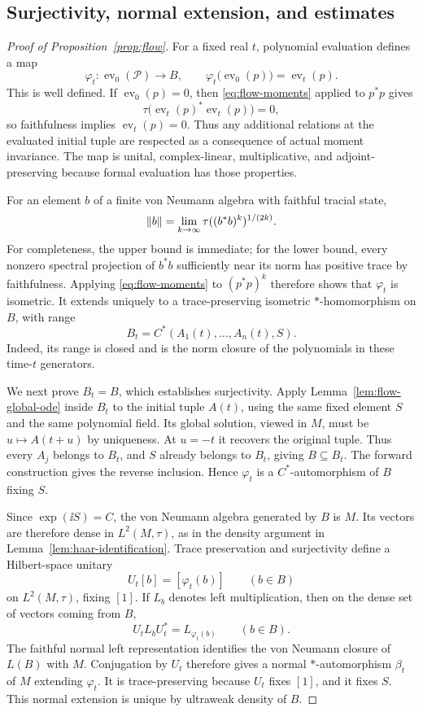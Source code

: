 \subsection{Surjectivity, normal extension, and estimates}

\begin{proof}[Proof of Proposition~\ref{prop:flow}]
For a fixed real $t$, polynomial evaluation defines a map
\[
 \varphi_t:\operatorname{ev}_0(\mathcal P)
      \longrightarrow B,
 \qquad
 \varphi_t\bigl(\operatorname{ev}_0(p)\bigr)
      =\operatorname{ev}_t(p).
\]
This is well defined. If $\operatorname{ev}_0(p)=0$, then
\eqref{eq:flow-moments} applied to $p^*p$ gives
\[
 \tau\bigl(\operatorname{ev}_t(p)^*
                 \operatorname{ev}_t(p)\bigr)=0,
\]
so faithfulness implies $\operatorname{ev}_t(p)=0$.
Thus any additional relations at the evaluated initial tuple
are respected as a consequence of actual moment invariance.
The map is unital, complex-linear, multiplicative, and
adjoint-preserving because formal evaluation has those
properties.

For an element $b$ of a finite von Neumann algebra with faithful
tracial state,
\[
 \left\lVert b\right\rVert
 =\lim_{k\to\infty}\tau((b^*b)^k)^{1/(2k)}.
\]
For completeness, the upper bound is immediate; for the lower
bound, every nonzero spectral projection of $b^*b$ sufficiently
near its norm has positive trace by faithfulness. Applying
\eqref{eq:flow-moments} to $(p^*p)^k$ therefore shows that
$\varphi_t$ is isometric. It extends uniquely to a
trace-preserving isometric $*$-homomorphism on $B$, with range
\[
 B_t=C^*(A_1(t),\ldots,A_n(t),S).
\]
Indeed, its range is closed and is the norm closure of the
polynomials in these time-$t$ generators.

We next prove $B_t=B$, which establishes surjectivity.
Apply Lemma~\ref{lem:flow-global-ode} inside $B_t$ to the
initial tuple $A(t)$, using the same fixed element $S$ and the
same polynomial field. Its global solution, viewed in $M$,
must be $u\mapsto A(t+u)$ by uniqueness. At $u=-t$ it recovers
the original tuple. Thus every $A_j$ belongs to $B_t$, and
$S$ already belongs to $B_t$, giving $B\subseteq B_t$.
The forward construction gives the reverse inclusion. Hence
$\varphi_t$ is a $C^*$-automorphism of $B$ fixing $S$.

Since $\exp(\ii S)=C$, the von Neumann algebra generated by
$B$ is $M$. Its vectors are therefore dense in $L^2(M,\tau)$,
as in the density argument in
Lemma~\ref{lem:haar-identification}. Trace preservation and
surjectivity define a Hilbert-space unitary
\[
 U_t[b]=[\varphi_t(b)]\qquad(b\in B)
\]
on $L^2(M,\tau)$, fixing $[1]$. If $L_b$ denotes left
multiplication, then on the dense set of vectors coming from
$B$,
\[
 U_t L_b U_t^*=L_{\varphi_t(b)}\qquad(b\in B).
\]
The faithful normal left representation identifies the von
Neumann closure of $L(B)$ with $M$. Conjugation by $U_t$
therefore gives a normal $*$-automorphism $\beta_t$ of $M$
extending $\varphi_t$. It is trace-preserving because $U_t$
fixes $[1]$, and it fixes $S$. This normal extension is unique
by ultraweak density of $B$.


\end{proof}
